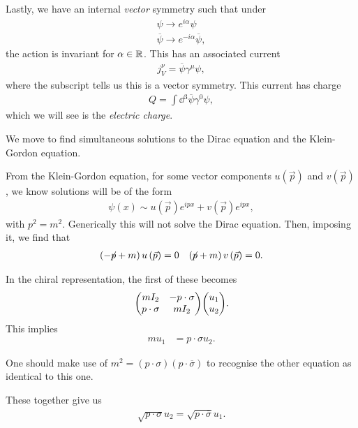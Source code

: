 Lastly, we have an internal \emph{vector} symmetry such that under
\begin{align}
    \psi \to e^{i\alpha}\psi \\
    \overline{\psi} \to e^{-i\alpha} \overline{\psi}
,\end{align}
the action is invariant for $\alpha \in \mathbb{R}$. This has an associated current
\begin{align}
    j^{\nu}_V = \overline{\psi} \gamma^{\mu} \psi
,\end{align}
where the subscript tells us this is a vector symmetry. This current has charge
\begin{align}
    Q = \int \dd{^3} \overline{\psi}\gamma^{0}\psi
,\end{align}
which we will see is the \textit{electric charge}.

We move to find simultaneous solutions to the Dirac equation and the Klein-Gordon equation.

From the Klein-Gordon equation, for some vector components $u \left( \vec{p} \right) $ and $v\left( \vec{p} \right) $, we know solutions will be of the form
\begin{align}
    \psi \left( x \right) \sim  u\left( \vec{p} \right) e^{i p x} + v \left( \vec{p} \right) e^{ipx}
,\end{align}
with $p^2 = m^2$. Generically this will not solve the Dirac equation. Then, imposing it, we find that
\begin{align}
    \left( -\fbs{p}+m \right) u \left( \vec{p} \right) =0 && \left( \fbs{p} + m \right) v \left( \vec{p} \right) =0
.\end{align}

In the chiral representation, the first of these becomes
\begin{align}
    \mqty( m I_2 & - p \cdot \sigma \\ p \cdot \sigma & m I_2 ) \mqty(u_1 \\ u_2)
.\end{align}
This implies
\begin{align}
    m u_1 &= p \cdot \sigma u_2
.\end{align}

\begin{note}
    One should make use of $m^2 = \left( p \cdot \sigma \right) \left(  p \cdot \overline{\sigma} \right) $ to recognise the other equation as identical to this one.
\end{note}

These together give us
\begin{align}
    \sqrt{p \cdot \sigma}  u_2 = \sqrt{p \cdot \overline{\sigma}}  u_1
.\end{align}

